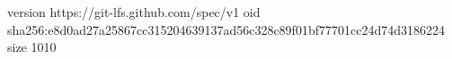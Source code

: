 version https://git-lfs.github.com/spec/v1
oid sha256:e8d0ad27a25867cc315204639137ad56c328c89f01bf77701cc24d74d3186224
size 1010
